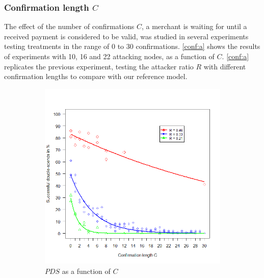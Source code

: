 \documentclass[a4paper,12pt,twoside]{report}
\begin{document}
\subsubsection{Confirmation length $C$}
The effect of the number of confirmations $C$, a merchant is waiting for until a received payment is considered to be valid, was studied in several experiments testing treatments in the range of 0 to 30 confirmations. \autoref{conf:a} shows the results of experiments with 10, 16 and 22 attacking nodes, as a function of $C$. \autoref{conf:a} replicates the previous experiment, testing the attacker ratio $R$ with different confirmation lengths to compare with our reference model.\begin{figure}
\centering
\begin{subfigure}{.5\textwidth}
  \centering
  \includegraphics[width=\linewidth]{Experiments/Confirmations/conf.png}
  \caption{$PDS$ as a function of $C$}
  \label{conf:a}
\end{subfigure}%
\begin{subfigure}{.5\textwidth}
  \centering

\end{subfigure}
\end{figure}
\end{document}

